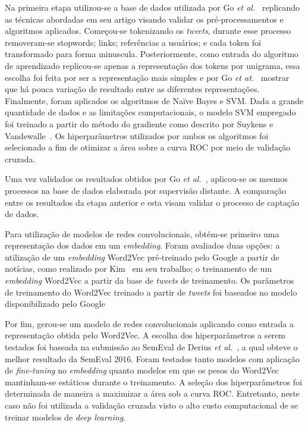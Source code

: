 Na primeira etapa utilizou-se a base de dados utilizada por Go \textit{et al.}~\cite{go09} replicando as técnicas
abordadas em seu artigo visando validar os pré-processamentos e algoritmos aplicados.
Começou-se tokenizando os \textit{tweets}, durante esse processo removeram-se stopwords; links; referências a usuários;
e cada token foi transformado para forma minuscula.
Posteriormente, como entrada do algoritmo de aprendizado replicou-se apenas a representação dos tokens por unigrama,
essa escolha foi feita por ser a representação mais simples e por Go \textit{et at.}~\cite{go09} mostrar que há pouca
variação de resultado entre as diferentes representações.
Finalmente, foram aplicados os algoritmos de Naïve Bayes e SVM.
Dada a grande quantidade de dados e as limitações computacionais, o modelo SVM empregado foi treinado a partir do método
do gradiente como descrito por Suykens e Vandewalle~\cite{suykens99}.
Os hiperparâmetros utilizados por ambos os algoritmos foi selecionado a fim de otimizar a área sobre a curva ROC por
meio de validação cruzada.

Uma vez validados os resultados obtidos por Go \textit{et al.}~\cite{go09}, aplicou-se os mesmos processos na base de
dados elaborada por supervisão distante.
A comparação entre os resultados da etapa anterior e esta visam validar o processo de captação de dados.

Para utilização de modelos de redes convolucionais, obtém-se primeiro uma representação dos dados em um
\textit{embedding}.
Foram avaliados duas opções: a utilização de um \textit{embedding} Word2Vec pré-treinado pelo Google a partir de
notícias, como realizado por Kim~\cite{kim14} em seu trabalho; o treinamento de um \textit{embedding} Word2Vec a partir
da base de \textit{tweets} de treinamento.
Os parâmetros de treinamento do Word2Vec treinado a partir de \textit{tweets} foi baseados no modelo disponibilizado
pelo Google

Por fim, gerou-se um modelo de redes convolucionais aplicando como entrada a representação obtida pelo Word2Vec.
A escolha dos hiperparâmetros a serem testados foi baseada na submissão ao SemEval de Derius
\textit{et al.}~\cite{deriu16}, a qual obteve o melhor resultado da SemEval 2016.
Foram testados tanto modelos com aplicação de \textit{fine-tuning} no \textit{embedding} quanto modelos em que os pesos
do Word2Vec mantinham-se estáticos durante o treinamento.
A seleção dos hiperparâmetros foi determinada de maneira a maximizar a área sob a curva ROC.
Entretanto, neste caso não foi utilizada a validação cruzada visto o alto custo computacional de se treinar modelos de
\textit{deep learning}.
